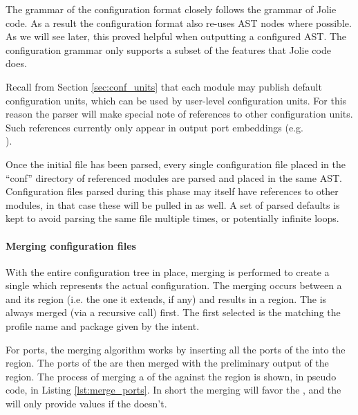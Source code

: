 The grammar of the configuration format closely follows the grammar of Jolie
code. As a result the configuration format also re-uses AST nodes where
possible. As we will see later, this proved helpful when outputting a
configured AST. The configuration grammar only supports a subset of the
features that Jolie code does.

Recall from Section \ref{sec:conf_units} that each module may publish default
configuration units, which can be used by user-level configuration units. For
this reason the parser will make special note of references to other
configuration units. Such references currently only appear in output port
embeddings (e.g. \\).

Once the initial file has been parsed, every single configuration file placed
in the ``conf'' directory of referenced modules are parsed and placed in the
same AST. Configuration files parsed during this phase may itself have
references to other modules, in that case these will be pulled in as well.  A
set of parsed defaults is kept to avoid parsing the same file multiple times,
or potentially infinite loops.

\paragraph{Merging configuration files}

With the entire configuration tree in place, merging is performed to create a
single  which represents the actual configuration. The merging
occurs between a  and its  region (i.e. the one it
extends, if any) and results in a  region. The  is
always merged (via a recursive call) first. The first  selected is
the  matching the profile name and package given by the intent.

For ports, the merging algorithm works by inserting all the ports of the
 into the  region. The ports of the  are
then merged with the preliminary output of the  region. The
process of merging a  of the  against the 
region is shown, in pseudo code, in Listing \ref{lst:merge_ports}. In short the
merging will favor the , and the  will only provide
values if the  doesn't.

